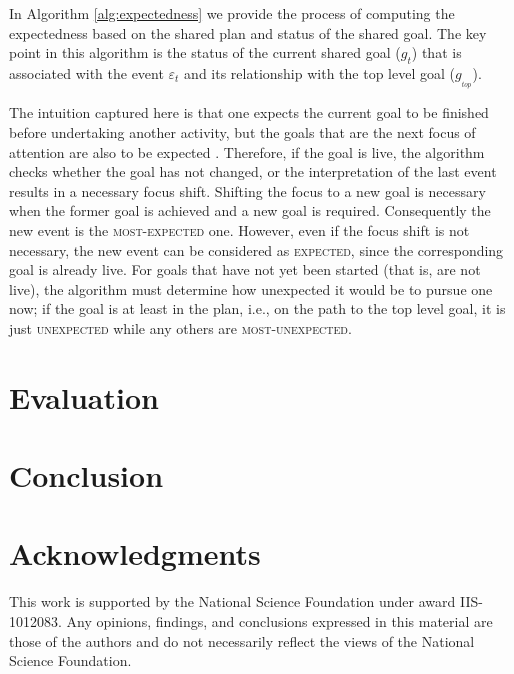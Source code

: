 \documentclass{aamas2016_extendedabstract}
\begin{document}
In Algorithm \ref{alg:expectedness} we provide the process of computing the
expectedness based on the shared plan and status of the shared goal. The key
point in this algorithm is the status of the current shared goal
($\mathit{g}_{t}$) that is associated with the event $\varepsilon_t$ and its
relationship with the top level goal ($\mathit{g}_{_{top}}$).

The intuition captured here is that one expects the current goal to be finished
before undertaking another activity, but the goals that are the next focus of
attention are also to be expected \cite{rich:focused-unfocused-users}.
Therefore, if the goal is live, the algorithm checks whether the goal has not
changed, or the interpretation of the last event results in a necessary focus
shift. Shifting the focus to a new goal is necessary when the former goal is
achieved and a new goal is required. Consequently the new event is the
\textsc{most-expected} one. However, even if the focus shift is not necessary,
the new event can be considered as \textsc{expected}, since the corresponding
goal is already live. For goals that have not yet been started (that is, are not
live), the algorithm must determine how unexpected it would be to pursue one
now; if the goal is at least in the plan, i.e., on the path to the top level
goal, it is just \textsc{unexpected} while any others are
\textsc{most-unexpected}.

\section{Evaluation}

\section{Conclusion}

\section*{Acknowledgments}

{\fontsize{8.2}{9}\selectfont This work is supported by the National Science
Foundation under award IIS-1012083. Any opinions, findings, and conclusions
expressed in this material are those of the authors and do not necessarily
reflect the views of the National Science Foundation.}



\end{document}
